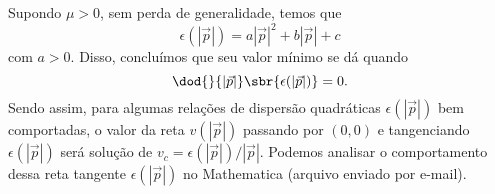 \documentclass[]{IMTexam}
\begin{document}
\begin{questions}
\begin{parts}
		\begin{solution}
			Supondo $ \mu>0 $, sem perda de generalidade, temos que \[ \epsilon(|\vec{p}|)=a|\vec{p}|^{2}+b|\vec{p}|+c \] com $ a>0 $.
			Disso, concluímos que seu valor mínimo se dá quando \[ \dod{}{|\vec{p}|}\sbr{\epsilon(|\vec{p}|)}=0. \]
			Sendo assim, para algumas relações de dispersão quadráticas $ \epsilon(|\vec{p}|) $ bem comportadas, o valor da reta $ v(|\vec{p}|) $ passando por $ (0,0) $ e tangenciando $ \epsilon(|\vec{p}|) $ será solução de $ v_c=\epsilon(|\vec{p}|)/|\vec{p}| $.
			Podemos analisar o comportamento dessa reta tangente $ \epsilon(|\vec{p}|) $ no Mathematica (arquivo enviado por e-mail).





\end{solution}
\end{parts}
\end{questions}
\end{document}

